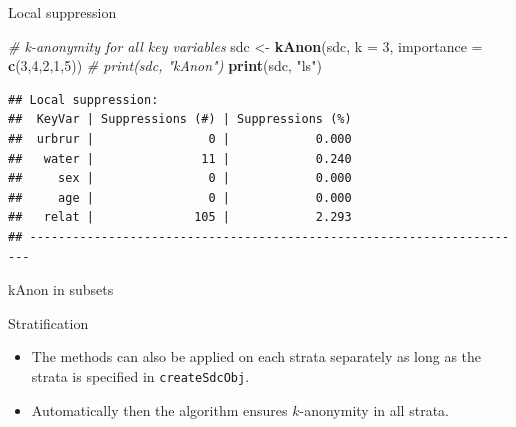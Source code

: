 \documentclass[ignorenonframetext,]{beamer}
\newenvironment{Shaded}{\begin{snugshade}}{\end{snugshade}}
\newcommand{\CommentTok}[1]{\textcolor[rgb]{0.56,0.35,0.01}{\textit{#1}}}
\newcommand{\DataTypeTok}[1]{\textcolor[rgb]{0.13,0.29,0.53}{#1}}
\newcommand{\DecValTok}[1]{\textcolor[rgb]{0.00,0.00,0.81}{#1}}
\newcommand{\KeywordTok}[1]{\textcolor[rgb]{0.13,0.29,0.53}{\textbf{#1}}}
\newcommand{\NormalTok}[1]{#1}
\newcommand{\StringTok}[1]{\textcolor[rgb]{0.31,0.60,0.02}{#1}}
\providecommand{\tightlist}{%
  \setlength{\itemsep}{0pt}\setlength{\parskip}{0pt}}
\begin{document}
\begin{frame}[fragile]{Local suppression}
\protect\hypertarget{local-suppression-2}{}

\begin{Shaded}
\begin{Highlighting}[]
\CommentTok{# k-anonymity for all key variables}
\NormalTok{sdc <-}\StringTok{ }\KeywordTok{kAnon}\NormalTok{(sdc, }\DataTypeTok{k =} \DecValTok{3}\NormalTok{, }\DataTypeTok{importance =} \KeywordTok{c}\NormalTok{(}\DecValTok{3}\NormalTok{,}\DecValTok{4}\NormalTok{,}\DecValTok{2}\NormalTok{,}\DecValTok{1}\NormalTok{,}\DecValTok{5}\NormalTok{)) }
\CommentTok{# print(sdc, "kAnon")}
\KeywordTok{print}\NormalTok{(sdc, }\StringTok{"ls"}\NormalTok{)}
\end{Highlighting}
\end{Shaded}

\begin{verbatim}
## Local suppression:
##  KeyVar | Suppressions (#) | Suppressions (%)
##  urbrur |                0 |            0.000
##   water |               11 |            0.240
##     sex |                0 |            0.000
##     age |                0 |            0.000
##   relat |              105 |            2.293
## ----------------------------------------------------------------------
\end{verbatim}

\end{frame}

\begin{frame}{kAnon in subsets}
\protect\hypertarget{kanon-in-subsets}{}

Stratification

\begin{itemize}
\tightlist
\item
  The methods can also be applied on each strata separately as long as
  the strata is specified in \texttt{createSdcObj}.
\item
  Automatically then the algorithm ensures \(k\)-anonymity in all
  strata.
\end{itemize}

\end{frame}
\end{document}
